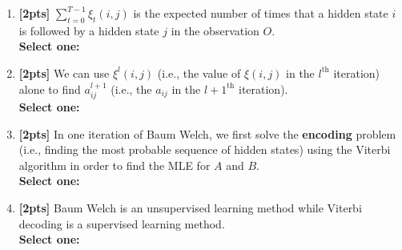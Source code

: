 \begin{enumerate}
\begin{enumerate}
\begin{tcolorbox}[fit,height=4cm, width=15cm, blank, borderline={1pt}{-2pt},nobeforeafter]
        \end{tcolorbox} \\
        \item \textbf{[2pts]} $\sum_{t=0}^{T-1}\xi_t(i, j)$ is the expected number of times that a hidden state $i$ is followed by a hidden state $j$ in the observation $O$. \\
        \textbf{Select one:}
        \item \textbf{[2pts]} We can use $\xi^l(i, j)$  (i.e., the value of $\xi(i, j)$ in the $l^{\textrm{th}}$ iteration) alone to find $a^{l+1}_{ij}$ (i.e., the $a_{ij}$ in the $l+1^{\textrm{th}}$ iteration).\\
        \textbf{Select one:}
        \clearpage
        \item \textbf{[2pts]} In one iteration of Baum Welch, we first solve the \textbf{encoding} problem (i.e., finding the most probable sequence of hidden states) using the Viterbi algorithm in order to find the MLE for $A$ and $B$. \\
        \textbf{Select one:}
        
        \item \textbf{[2pts]} Baum Welch is an unsupervised learning method while Viterbi decoding is a supervised learning method.\\
        \textbf{Select one:}
        
   \end{enumerate}
    
\end{enumerate}